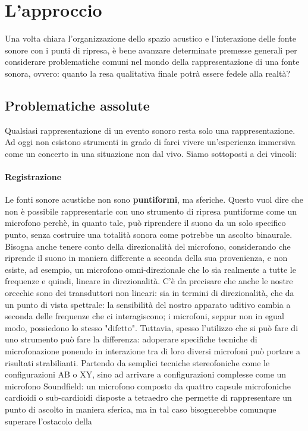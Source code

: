 
\section{L'approccio}
Una volta chiara l'organizzazione dello spazio acustico e l'interazione delle fonte sonore con i punti di ripresa, è bene avanzare determinate premesse generali per considerare problematiche comuni nel mondo della rappresentazione di una fonte sonora, ovvero: quanto la resa qualitativa finale potrà essere fedele alla realtà?

	\subsection{Problematiche assolute}
	Qualsiasi rappresentazione di un evento sonoro resta solo una rappresentazione. Ad oggi non esistono strumenti in grado di farci vivere un'esperienza immersiva come un concerto in una situazione non dal vivo. Siamo sottoposti a dei vincoli:
	
	\paragraph{Registrazione} Le fonti sonore acustiche non sono \textbf{puntiformi}, ma sferiche. Questo vuol dire che non è possibile rappresentarle con uno strumento di ripresa puntiforme come un microfono perchè, in quanto tale, può riprendere il suono da un solo specifico punto, senza costruire una totalità sonora come potrebbe un ascolto binaurale. Bisogna anche tenere conto della direzionalità del microfono, considerando che riprende il suono in maniera differente a seconda della sua provenienza, e non esiste, ad esempio, un microfono omni-direzionale che lo sia realmente a tutte le frequenze e quindi, lineare in direzionalità. C'è da precisare che anche le nostre orecchie sono dei transduttori non lineari: sia in termini di direzionalità, che da un punto di vista spettrale: la sensibilità del nostro apparato uditivo cambia a seconda delle frequenze che ci interagiscono; i microfoni, seppur non in egual modo, possiedono lo stesso "difetto".
	Tuttavia, spesso l'utilizzo che si può fare di uno strumento può fare la differenza: adoperare specifiche tecniche di microfonazione ponendo in interazione tra di loro diversi microfoni può portare a risultati strabilianti. Partendo da semplici tecniche stereofoniche come  le configurazioni AB o XY, sino ad arrivare a configurazioni complesse come un microfono Soundfield: un microfono composto da quattro capsule microfoniche cardioidi o sub-cardioidi disposte a tetraedro che permette di rappresentare un punto di ascolto in maniera sferica, ma in tal caso bisognerebbe comunque superare l'ostacolo della
	
